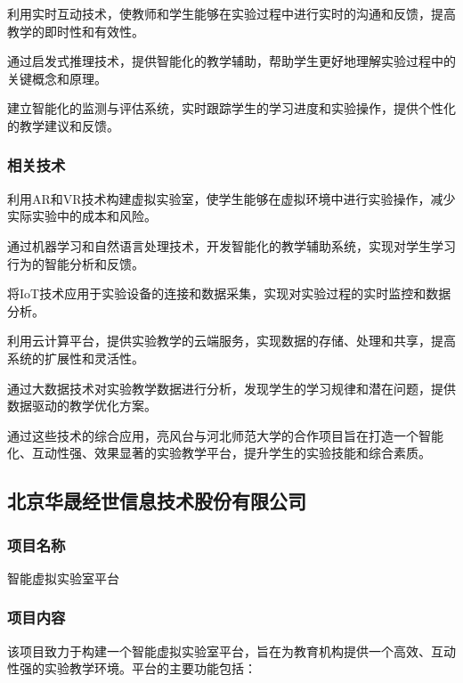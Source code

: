 利用实时互动技术，使教师和学生能够在实验过程中进行实时的沟通和反馈，提高教学的即时性和有效性。

通过启发式推理技术，提供智能化的教学辅助，帮助学生更好地理解实验过程中的关键概念和原理。

建立智能化的监测与评估系统，实时跟踪学生的学习进度和实验操作，提供个性化的教学建议和反馈。

\subsubsection{相关技术}


利用AR和VR技术构建虚拟实验室，使学生能够在虚拟环境中进行实验操作，减少实际实验中的成本和风险。

通过机器学习和自然语言处理技术，开发智能化的教学辅助系统，实现对学生学习行为的智能分析和反馈。

将IoT技术应用于实验设备的连接和数据采集，实现对实验过程的实时监控和数据分析。

利用云计算平台，提供实验教学的云端服务，实现数据的存储、处理和共享，提高系统的扩展性和灵活性。

通过大数据技术对实验教学数据进行分析，发现学生的学习规律和潜在问题，提供数据驱动的教学优化方案。

通过这些技术的综合应用，亮风台与河北师范大学的合作项目旨在打造一个智能化、互动性强、效果显著的实验教学平台，提升学生的实验技能和综合素质。

\subsection{北京华晟经世信息技术股份有限公司}

\subsubsection{项目名称}

智能虚拟实验室平台

\subsubsection{项目内容}

该项目致力于构建一个智能虚拟实验室平台，旨在为教育机构提供一个高效、互动性强的实验教学环境。平台的主要功能包括：

